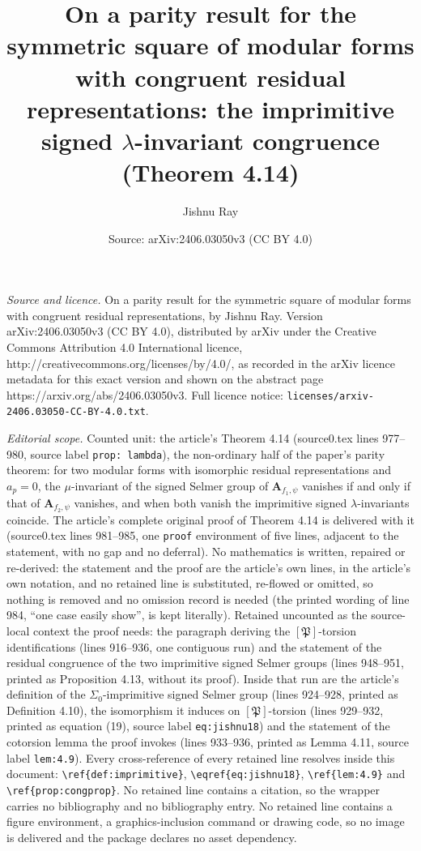 \documentclass[10pt,a4paper]{amsart}
\title[Theorem 4.14]{On a parity result for the symmetric square of modular forms with congruent residual representations: the imprimitive signed $\lambda$-invariant congruence (Theorem 4.14)}
\author{Jishnu Ray}
\date{Source: arXiv:2406.03050v3 (CC BY 4.0)}
\newcommand{\bA}{\mathbf{A}}
\begin{document}
\maketitle

\noindent\emph{Source and licence.} On a parity result for the symmetric square of modular forms with congruent residual representations, by Jishnu Ray. Version arXiv:2406.03050v3
(CC BY 4.0), distributed by arXiv under the Creative Commons Attribution 4.0 International licence,
http://creativecommons.org/licenses/by/4.0/, as recorded in the arXiv licence metadata for this exact
version and shown on the abstract page https://arxiv.org/abs/2406.03050v3. Full licence notice:
\texttt{licenses/arxiv-2406.03050-CC-BY-4.0.txt}.\par\smallskip

\noindent\textit{Editorial scope.} Counted unit: the article's Theorem 4.14 (source0.tex lines 977--980, source label \texttt{prop: lambda}), the non-ordinary half of the paper's parity theorem: for two modular forms with isomorphic residual representations and $a_p=0$, the $\mu$-invariant of the signed Selmer group of $\bA_{f_1,\psi}$ vanishes if and only if that of $\bA_{f_2,\psi}$ vanishes, and when both vanish the imprimitive signed $\lambda$-invariants coincide. The article's complete original proof of Theorem 4.14 is delivered with it (source0.tex lines 981--985, one \texttt{proof} environment of five lines, adjacent to the statement, with no gap and no deferral). No mathematics is written, repaired or re-derived: the statement and the proof are the article's own lines, in the article's own notation, and no retained line is substituted, re-flowed or omitted, so nothing is removed and no omission record is needed (the printed wording of line 984, ``one case easily show'', is kept literally). Retained uncounted as the source-local context the proof needs: the paragraph deriving the $[\mathfrak{P}]$-torsion identifications (lines 916--936, one contiguous run) and the statement of the residual congruence of the two imprimitive signed Selmer groups (lines 948--951, printed as Proposition 4.13, without its proof). Inside that run are the article's definition of the $\Sigma_0$-imprimitive signed Selmer group (lines 924--928, printed as Definition 4.10), the isomorphism it induces on $[\mathfrak{P}]$-torsion (lines 929--932, printed as equation (19), source label \texttt{eq:jishnu18}) and the statement of the cotorsion lemma the proof invokes (lines 933--936, printed as Lemma 4.11, source label \texttt{lem:4.9}). Every cross-reference of every retained line resolves inside this document: \texttt{\textbackslash ref\{def:imprimitive\}}, \texttt{\textbackslash eqref\{eq:jishnu18\}}, \texttt{\textbackslash ref\{lem:4.9\}} and \texttt{\textbackslash ref\{prop:congprop\}}. No retained line contains a citation, so the wrapper carries no bibliography and no bibliography entry. No retained line contains a figure environment, a graphics-inclusion command or drawing code, so no image is delivered and the package declares no asset dependency.
\end{document}
